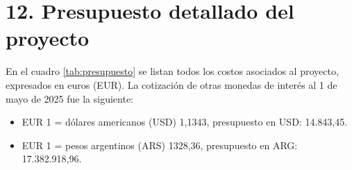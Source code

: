 \documentclass[
11pt, %
]{charter}
\begin{document}



\section{12. Presupuesto detallado del proyecto}
\label{sec:presupuesto}

En el cuadro \ref{tab:presupuesto} se listan todos los costos asociados al proyecto, expresados en euros (EUR). La cotización de otras monedas de interés al 1 de mayo de 2025 fue la siguiente:

\begin{itemize}
	\item EUR 1 = dólares americanos (USD) 1,1343, presupuesto en USD: 14.843,45. 
	\item EUR 1 = pesos argentinos (ARS) 1328,36, presupuesto en ARG: 17.382.918,96.
\end{itemize}
\end{document}
